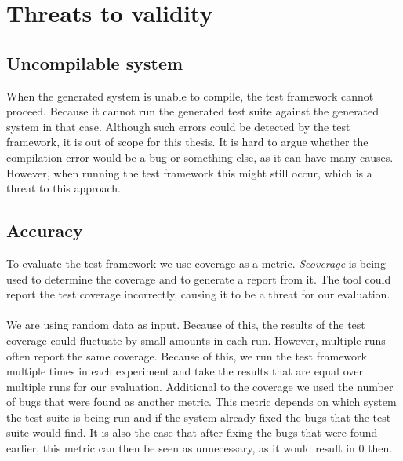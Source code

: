 \section{Threats to validity}

\subsection*{Uncompilable system}
When the generated system is unable to compile, the test framework cannot
proceed. Because it cannot run the generated test suite against the generated
system in that case. Although such errors could be detected by the test
framework, it is out of scope for this thesis. It is hard to argue whether the
compilation error would be a bug or something else, as it can have many causes.
However, when running the test framework this might still occur, which is a
threat to this approach.

\subsection*{Accuracy}
To evaluate the test framework we use coverage as a metric. \textit{Scoverage}
is being used to determine the coverage and to generate a report from it. The
tool could report the test coverage incorrectly, causing it to be a threat for
our evaluation.\\
\\
We are using random data as input. Because of this, the results of the test
coverage could fluctuate by small amounts in each run. However, multiple runs often report the same coverage. Because of this, we run the test framework multiple times in each experiment and take the results that are equal over multiple runs for our evaluation. Additional to the coverage we used the number of bugs that were
found as another metric. This metric depends on which system the test suite is
being run and if the system already fixed the bugs that the test suite would
find. It is also the case that after fixing the bugs that were found earlier,
this metric can then be seen as unnecessary, as it would result in 0 then.

